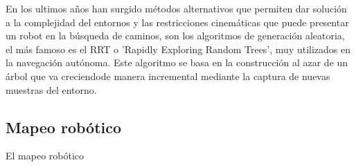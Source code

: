 En los ultimos años han surgido métodos alternativos que permiten dar solución a
la complejidad del entornos y las restricciones cinemáticas que puede presentar
un robot en la búsqueda de caminos, son los algoritmos de generación aleatoria,
el más famoso es el RRT o 'Rapidly Exploring Random Trees', muy utilizados en la
navegación autónoma. Este algoritmo se basa en la construcción al azar de un 
árbol que va creciendode manera incremental mediante la captura de nuevas
muestras del entorno.

\subsection{Mapeo robótico}

El mapeo robótico 



